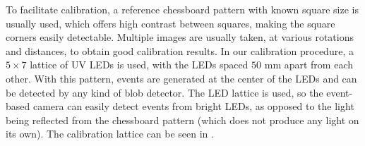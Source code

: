 To facilitate calibration, a reference chessboard pattern with known square size is usually used, which offers high contrast between squares, making the square corners easily detectable.
Multiple images are usually taken, at various rotations and distances, to obtain good calibration results.
In our calibration procedure, a $5\times7$ lattice of \ac{UV} \ac{LED}s is used, with the \ac{LED}s spaced $50$ mm apart from each other. With this pattern, events are generated at the center of the
\ac{LED}s and can be detected by any kind of blob detector. The \ac{LED} lattice is used, so the event-based camera can easily detect
events from bright \ac{LED}s, as opposed to
the light being reflected from the chessboard pattern (which does not produce any light on its own).
The calibration lattice can be seen in .

